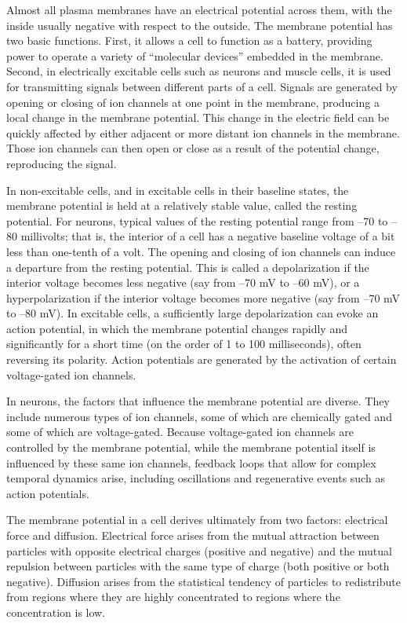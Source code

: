 \documentclass[]{book}
\begin{document}
Almost all plasma membranes have an electrical potential across them, with the inside usually negative with respect to the outside. The membrane potential has two basic functions. First, it allows a cell to function as a battery, providing power to operate a variety of ``molecular devices'' embedded in the membrane. Second, in electrically excitable cells such as neurons and muscle cells, it is used for transmitting signals between different parts of a cell. Signals are generated by opening or closing of ion channels at one point in the membrane, producing a local change in the membrane potential. This change in the electric field can be quickly affected by either adjacent or more distant ion channels in the membrane. Those ion channels can then open or close as a result of the potential change, reproducing the signal.

In non-excitable cells, and in excitable cells in their baseline states, the membrane potential is held at a relatively stable value, called the resting potential. For neurons, typical values of the resting potential range from --70 to --80 millivolts; that is, the interior of a cell has a negative baseline voltage of a bit less than one-tenth of a volt. The opening and closing of ion channels can induce a departure from the resting potential. This is called a depolarization if the interior voltage becomes less negative (say from --70 mV to --60 mV), or a hyperpolarization if the interior voltage becomes more negative (say from --70 mV to --80 mV). In excitable cells, a sufficiently large depolarization can evoke an action potential, in which the membrane potential changes rapidly and significantly for a short time (on the order of 1 to 100 milliseconds), often reversing its polarity. Action potentials are generated by the activation of certain voltage-gated ion channels.

In neurons, the factors that influence the membrane potential are diverse. They include numerous types of ion channels, some of which are chemically gated and some of which are voltage-gated. Because voltage-gated ion channels are controlled by the membrane potential, while the membrane potential itself is influenced by these same ion channels, feedback loops that allow for complex temporal dynamics arise, including oscillations and regenerative events such as action potentials.

The membrane potential in a cell derives ultimately from two factors: electrical force and diffusion. Electrical force arises from the mutual attraction between particles with opposite electrical charges (positive and negative) and the mutual repulsion between particles with the same type of charge (both positive or both negative). Diffusion arises from the statistical tendency of particles to redistribute from regions where they are highly concentrated to regions where the concentration is low.
\end{document}
